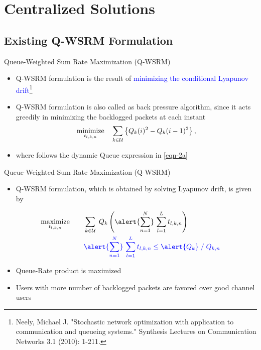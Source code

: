 \documentclass[9pt]{beamer}
\let\oldfootnote\footnote
\renewcommand\footnote[1][]{\oldfootnote[frame,#1]}
\begin{document}
\section{Centralized Solutions}

\subsection{Existing \acs{Q-WSRM} Formulation}

\begin{frame}{Queue-Weighted Sum Rate Maximization (\acs{Q-WSRM})}
\begin{itemize}
\item \acs{Q-WSRM} formulation is the result of \textcolor{blue}{minimizing the conditional Lyapunov drift}\footnote{Neely, Michael J. "Stochastic network optimization with application to communication and queueing systems." Synthesis Lectures on Communication Networks 3.1 (2010): 1-211.}
\item \acs{Q-WSRM} formulation is also called as \alert{back pressure algorithm}, since it acts greedily in minimizing the backlogged packets at each instant
\[ \underset{t_{l,k,n}}{\text{minimize}} \quad \sum_{k \in \mathcal{U}} \left \lbrace Q_k(i)^2 - Q_k(i-1)^2 \right \rbrace, \]
\item where  follows the dynamic Queue expression in \eqref{eqn-2a}
\end{itemize}
\end{frame}

\begin{frame}{Queue-Weighted Sum Rate Maximization (\acs{Q-WSRM})}
\begin{itemize}
\item \acs{Q-WSRM} formulation, which is obtained by solving Lyapunov drift, is given by
\end{itemize}
\begin{subequations}
\begin{align}
 \underset{t_{l,k,n}}{\text{maximize}} & \qquad \sum_{k \in \mc{U}} \; Q_k \left ( \alert{\sum_{n=1}^N} \, \sum_{l = 1}^L  t_{l,k,n} \right ) \\
& \qquad {\color{blue} \alert{\sum_{n=1}^N} \, \sum_{l = 1}^L  t_{l,k,n}  \leq \alert{Q_k} \; / \; Q_{k,n}}
\end{align}
\end{subequations}
\begin{itemize}
\item Queue-Rate product is maximized
\item Users with more number of backlogged packets are favored over good channel users
\end{itemize}
\end{frame}
\end{document}
